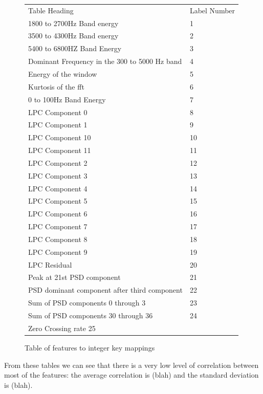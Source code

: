 \documentclass[ %
                    author={Sam Phippen},
                supervisor={Dr. Rafal Bogacz},
                     title={Real time voice activity detectors in noisy personal computing environments},
                  subtitle={},
                    degree={MEng},
                      year={2012} ]{thesis}
\begin{document}
\begin{figure}
    \begin{tabular}{ |l|l| }
        Table Heading & Label Number \\
        1800 to 2700Hz Band energy & 1 \\
        3500 to 4300Hz Band energy & 2 \\
        5400 to 6800HZ Band Energy & 3 \\
        Dominant Frequency in the 300 to 5000 Hz band & 4 \\
        Energy of the window & 5 \\
        Kurtosis of the fft & 6 \\
        0 to 100Hz Band Energy & 7 \\
        LPC Component 0 & 8 \\
        LPC Component 1 & 9 \\
        LPC Component 10 & 10 \\
        LPC Component 11 & 11 \\
        LPC Component 2 & 12 \\
        LPC Component 3 & 13 \\
        LPC Component 4 & 14 \\
        LPC Component 5 & 15 \\
        LPC Component 6 & 16 \\
        LPC Component 7 & 17 \\
        LPC Component 8 & 18 \\
        LPC Component 9 & 19 \\
        LPC Residual & 20 \\
        Peak at 21st PSD component & 21 \\
        PSD dominant component after third component & 22 \\
        Sum of PSD components 0 through 3 & 23 \\
        Sum of PSD components 30 through 36 & 24 \\
        Zero Crossing rate 25 & \\
    \end{tabular}
    \caption{Table of features to integer key mappings}
    \label{fig:feature-keys}
\end{figure}

From these tables we can see that there is a very low level of correlation
between most of the features: the average correlation is (blah) and the
standard deviation is (blah).
\end{document}
